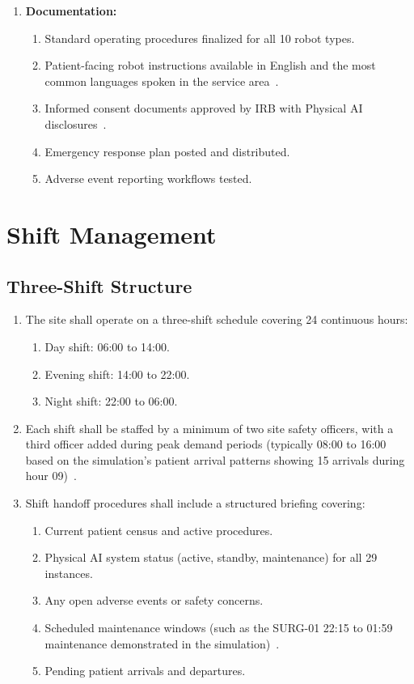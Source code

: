 \begin{enumerate}[label=(\alph*)]
\item \textbf{Documentation:}
  \begin{enumerate}[label=(\arabic*)]
  \item Standard operating procedures finalized for all 10 robot types.
  \item Patient-facing robot instructions available in English and
    the most common languages spoken in the service
    area~\cite{patientinstructions2026}.
  \item Informed consent documents approved by IRB with Physical AI
    disclosures~\cite{cfr50adapt}.
  \item Emergency response plan posted and distributed.
  \item Adverse event reporting workflows tested.
  \end{enumerate}
\end{enumerate}

\section{Shift Management}

\subsection{Three-Shift Structure}

\begin{enumerate}[label=(\alph*)]
\item The site shall operate on a three-shift schedule covering 24 continuous
  hours:
  \begin{enumerate}[label=(\arabic*)]
  \item Day shift: 06:00 to 14:00.
  \item Evening shift: 14:00 to 22:00.
  \item Night shift: 22:00 to 06:00.
  \end{enumerate}

\item Each shift shall be staffed by a minimum of two site safety officers, with
  a third officer added during peak demand periods (typically 08:00 to 16:00
  based on the simulation's patient arrival patterns showing 15 arrivals
  during hour 09)~\cite{newtrial2026}.

\item Shift handoff procedures shall include a structured briefing covering:
  \begin{enumerate}[label=(\arabic*)]
  \item Current patient census and active procedures.
  \item Physical AI system status (active, standby, maintenance) for all 29
    instances.
  \item Any open adverse events or safety concerns.
  \item Scheduled maintenance windows (such as the SURG-01 22:15 to 01:59
    maintenance demonstrated in the simulation)~\cite{newtrial2026}.
  \item Pending patient arrivals and departures.
  \end{enumerate}
\end{enumerate}

